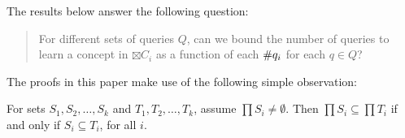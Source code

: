 The results below answer the following question:
\begin{quote}
For different sets of queries $Q$, can we bound the number of queries to learn a concept in $\boxtimes C_i $ as a function of each $\#q_{i}$ for each $q \in Q$?
\end{quote}

The proofs in this paper make use of the following simple observation:
\begin{observation}
\label{subobs}
For sets $S_1, S_2, \dots, S_k$ and $T_1, T_2, \dots, T_k$, assume $\prod S_i \ne \emptyset$.  Then $\prod S_i \subseteq \prod T_i$ if and only if $S_i \subseteq T_i$, for all $i$.
\end{observation}
